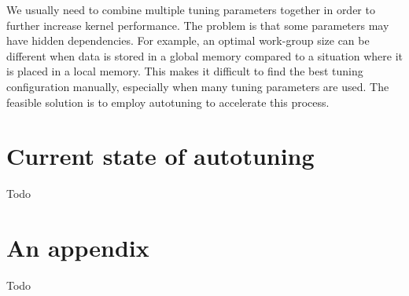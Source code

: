 \documentclass[
  digital,     %
  oneside,     %
  nosansbold,  %
  nocolorbold, %
  lof,         %
  lot,         %
  nocover
]{fithesis4}
\begin{document}
We usually need to combine multiple tuning parameters together in order to further increase kernel performance. The problem is that some parameters may have hidden dependencies. For example, an optimal work-group size can be different when data is stored in a global memory compared to a situation where it is placed in a local memory. This makes it difficult to find the best tuning configuration manually, especially when many tuning parameters are used. The feasible solution is to employ autotuning to accelerate this process.

\chapter{Current state of autotuning}
Todo

\printbibliography[heading=bibintoc]

\appendix
\chapter{An appendix}
Todo
\end{document}
